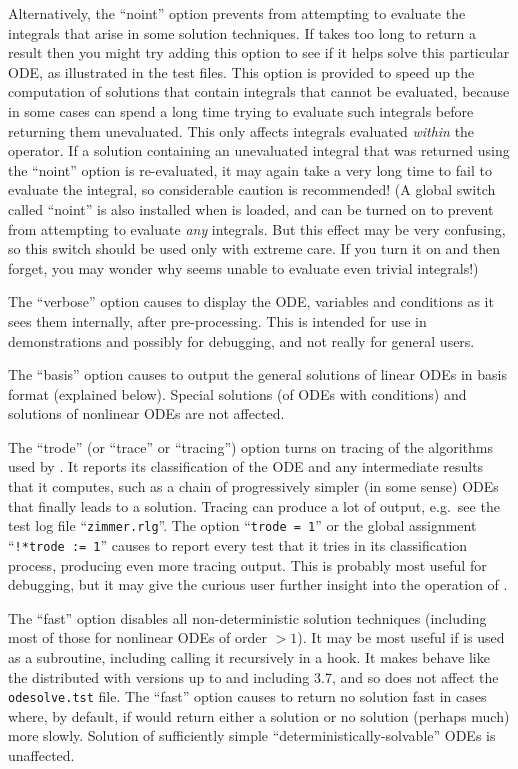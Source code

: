 Alternatively, the ``noint'' option prevents \REDUCE{} from attempting
to evaluate the integrals that arise in some solution techniques.  If
 takes too long to return a result then you might try
adding this option to see if it helps solve this particular ODE, as
illustrated in the test files.  This option is provided to speed up
the computation of solutions that contain integrals that cannot be
evaluated, because in some cases \REDUCE{} can spend a long time
trying to evaluate such integrals before returning them unevaluated.
This only affects integrals evaluated \emph{within} the 
operator.  If a solution containing an unevaluated integral that was
returned using the ``noint'' option is re-evaluated, it may again take
\REDUCE{} a very long time to fail to evaluate the integral, so
considerable caution is recommended!  (A global switch called
``noint'' is also installed when  is loaded, and can be
turned on to prevent \REDUCE{} from attempting to evaluate \emph{any}
integrals.  But this effect may be very confusing, so this switch
should be used only with extreme care.  If you turn it on and then
forget, you may wonder why \REDUCE{} seems unable to evaluate even
trivial integrals!)

The ``verbose'' option causes  to display the ODE,
variables and conditions as it sees them internally, after
pre-processing.  This is intended for use in demonstrations and
possibly for debugging, and not really for general users.

The ``basis'' option causes  to output the general
solutions of linear ODEs in basis format (explained below).  Special
solutions (of ODEs with conditions) and solutions of nonlinear ODEs
are not affected.

The ``trode'' (or ``trace'' or ``tracing'') option turns on tracing of
the algorithms used by .  It reports its classification
of the ODE and any intermediate results that it computes, such as a
chain of progressively simpler (in some sense) ODEs that finally leads
to a solution.  Tracing can produce a lot of output, e.g.\ see the
test log file ``\texttt{zimmer.rlg}''.  The option ``\texttt{trode =
1}'' or the global assignment ``\texttt{!*trode := 1}'' causes
 to report every test that it tries in its classification
process, producing even more tracing output.  This is probably most
useful for debugging, but it may give the curious user further insight
into the operation of .

The ``fast'' option disables all non-deterministic solution techniques
(including most of those for nonlinear ODEs of order $> 1$).  It may
be most useful if  is used as a subroutine, including
calling it recursively in a hook.  It makes  behave like
the \odesolve{} distributed with \REDUCE{} versions up to and
including 3.7, and so does not affect the \texttt{odesolve.tst} file.
The ``fast'' option causes  to return no solution fast in
cases where, by default, if would return either a solution or no
solution (perhaps much) more slowly.  Solution of sufficiently simple
``deterministically-solvable'' ODEs is unaffected.

